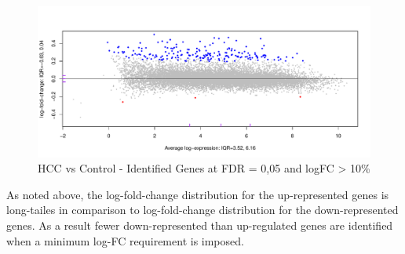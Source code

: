 \documentclass[
]{book}
\newenvironment{Shaded}{\begin{snugshade}}{\end{snugshade}}
\newcommand{\DataTypeTok}[1]{\textcolor[rgb]{0.13,0.29,0.53}{#1}}
\newcommand{\DecValTok}[1]{\textcolor[rgb]{0.00,0.00,0.81}{#1}}
\newcommand{\FloatTok}[1]{\textcolor[rgb]{0.00,0.00,0.81}{#1}}
\newcommand{\KeywordTok}[1]{\textcolor[rgb]{0.13,0.29,0.53}{\textbf{#1}}}
\newcommand{\NormalTok}[1]{#1}
\newcommand{\OperatorTok}[1]{\textcolor[rgb]{0.81,0.36,0.00}{\textbf{#1}}}
\newcommand{\StringTok}[1]{\textcolor[rgb]{0.31,0.60,0.02}{#1}}
\begin{document}
\begin{Shaded}
\end{Shaded}

\begin{figure}
\centering
\includegraphics{Static/figures/mdPlotTfit-1.pdf}
\caption{\label{fig:mdPlotTfit}HCC vs Control - Identified Genes at FDR = 0,05 and logFC \textgreater{} 10\%}
\end{figure}

As noted above, the log-fold-change distribution for the up-represented genes
is long-tailes in comparison to log-fold-change distribution for the down-represented genes.
As a result fewer down-represented than up-regulated genes are identified when a
minimum log-FC requirement is imposed.
\end{document}
